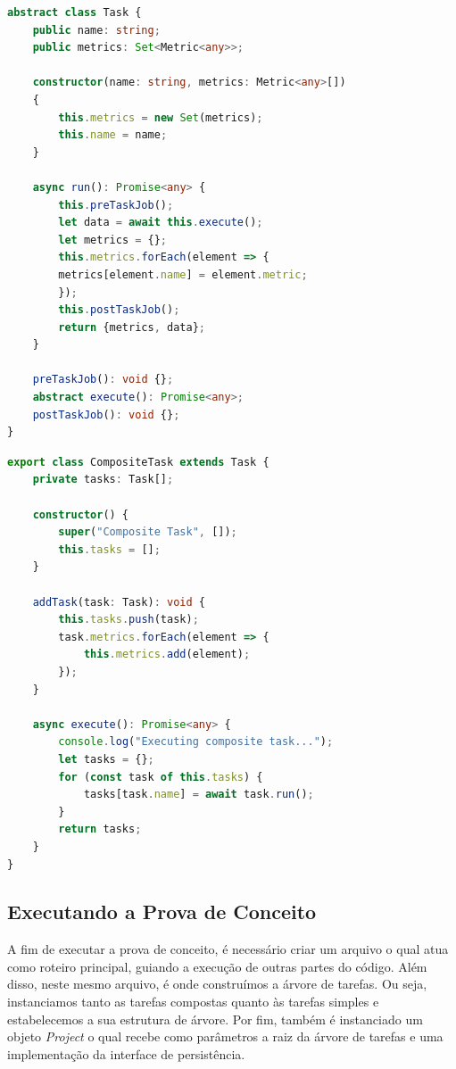 \documentclass[12pt]{tcc}
\begin{document}
\begin{lstlisting}[label={lst:abstract_task}, caption={Classe abstrata responsável por definir o que todos os membros da árvore de tarefas precisam implementar.}, language=TypeScript]
abstract class Task {
	public name: string;
	public metrics: Set<Metric<any>>;

	constructor(name: string, metrics: Metric<any>[])
	{
		this.metrics = new Set(metrics);
		this.name = name;
	}

	async run(): Promise<any> {
		this.preTaskJob();
		let data = await this.execute();
		let metrics = {};
		this.metrics.forEach(element => {
		metrics[element.name] = element.metric;
		});
		this.postTaskJob();
		return {metrics, data};
	}

	preTaskJob(): void {};
	abstract execute(): Promise<any>;
	postTaskJob(): void {};
}
\end{lstlisting}

\begin{lstlisting}[label={lst:composite_task}, caption={Tarefa composta, define o comportamento de todos os nós não folha da árvore de tarefas.}, language=TypeScript]
export class CompositeTask extends Task {
	private tasks: Task[];

	constructor() {
		super("Composite Task", []);
		this.tasks = [];
	}

	addTask(task: Task): void {
		this.tasks.push(task);
		task.metrics.forEach(element => {
			this.metrics.add(element);
		});
	}

	async execute(): Promise<any> {
		console.log("Executing composite task...");
		let tasks = {};
		for (const task of this.tasks) {
			tasks[task.name] = await task.run();
		}
		return tasks;
	}
}
\end{lstlisting}


\subsection{Executando a Prova de Conceito}
\label{sec:exe_poc}
A fim de executar a prova de conceito, é necessário criar um arquivo o qual atua como roteiro principal, guiando a execução de outras partes do código.
Além disso, neste mesmo arquivo, é onde construímos a árvore de tarefas.
Ou seja, instanciamos tanto as tarefas compostas quanto às tarefas simples e estabelecemos a sua estrutura de árvore.
Por fim, também é instanciado um objeto \emph{Project} o qual recebe como parâmetros a raiz da árvore de tarefas e uma implementação da interface de persistência.
\end{document}
